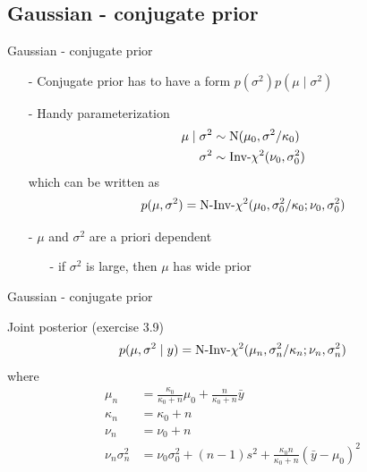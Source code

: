 \documentclass[10pt]{beamer}
\begin{document}
\subsection{Gaussian - conjugate prior}

\begin{frame}{Gaussian - conjugate prior}

  \begin{itemize}
  \item[-] Conjugate prior has to have a form
    $p(\sigma^2)p(\mu \mid \sigma^2)$\\
    \pause
  \item[-] Handy parameterization
    \begin{align*}
      \mu \mid \sigma^2 & \sim \mathrm{N}(\mu_0,\sigma^2/\kappa_0)\\
      \sigma^2 & \sim \Invchi2(\nu_0,\sigma_0^2)
    \end{align*}
    which can be written as
    \begin{align*}
      p(\mu,\sigma^2)=\NInvchi2(\mu_0,\sigma_0^2/\kappa_0;\nu_0,\sigma_0^2)
    \end{align*}
    \pause
  \item[-] $\mu$ and $\sigma^2$ are a priori dependent
    \begin{itemize}
      \item[-] if $\sigma^2$ is large, then $\mu$ has wide prior
    \end{itemize}
  \end{itemize}

\end{frame}

\begin{frame}{Gaussian - conjugate prior}

  Joint posterior (exercise 3.9)
    \begin{align*}
      p(\mu,\sigma^2 \mid y)=\NInvchi2(\mu_n,\sigma_n^2/\kappa_n;\nu_n,\sigma_n^2)
    \end{align*}
    where
    \begin{align*}
      \mu_n & = \frac{\kappa_0}{\kappa_0+n}\mu_0 + \frac{n}{\kappa_0+n}\bar{y} \\
      \kappa_n & = \kappa_0+n \\
      \nu_n & = \nu_0+n \\
      \nu_n\sigma_n^2 & =\nu_0\sigma_0^2 + (n-1)s^2 +
      \frac{\kappa_0 n}{\kappa_0+n}(\bar{y}-\mu_0)^2
    \end{align*}

\end{frame}
\end{document}
